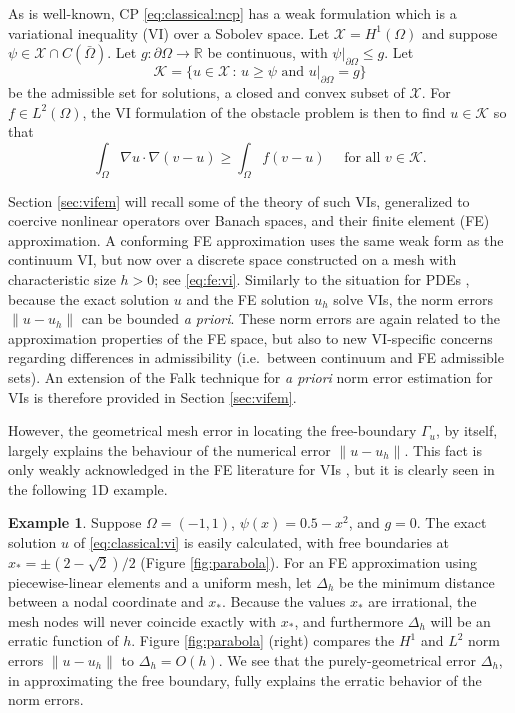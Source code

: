 \documentclass[]{interact}
\theoremstyle{plain}%
\theoremstyle{definition}
\newtheorem{example}[theorem]{Example}
\theoremstyle{remark}
\newcommand{\RR}{\mathbb{R}}
\newcommand{\cK}{\mathcal{K}}
\newcommand{\cX}{\mathcal{X}}
\begin{document}
As is well-known, CP \eqref{eq:classical:ncp} has a weak formulation which is a variational inequality (VI) over a Sobolev space.  Let $\cX=H^1(\Omega)$ \cite{ElmanSilvesterWathen2014} and suppose $\psi \in \cX \cap C(\bar\Omega)$.  Let $g:\partial \Omega\to \RR$ be continuous, with $\psi|_{\partial \Omega} \le g$.  Let
\begin{equation} \label{eq:classical:admissible}
\cK = \{u \in \cX \,:\, u \ge \psi \text{ and } u|_{\partial \Omega} = g\}
\end{equation}
be the admissible set for solutions, a closed and convex subset of $\cX$.  For $f\in L^2(\Omega)$, the VI formulation of the obstacle problem \cite{KinderlehrerStampacchia1980} is then to find $u\in \cK$ so that
\begin{equation} \label{eq:classical:vi}
\int_\Omega \nabla u \cdot \nabla(v - u) \ge \int_\Omega f(v - u) \quad \text{ for all } v \in \cK.
\end{equation}

Section \ref{sec:vifem} will recall some of the theory of such VIs, generalized to coercive nonlinear operators over Banach spaces, and their finite element (FE) approximation.  A conforming FE approximation uses the same weak form as the continuum VI, but now over a discrete space constructed on a mesh with characteristic size $h>0$; see \eqref{eq:fe:vi}.  Similarly to the situation for PDEs \cite{ElmanSilvesterWathen2014}, because the exact solution $u$ and the FE solution $u_h$ solve VIs, the norm errors $\|u-u_h\|$ can be bounded \emph{a priori}.  These norm errors are again related to the approximation properties of the FE space, but also to new VI-specific concerns regarding differences in admissibility (i.e.~between continuum and FE admissible sets).  An extension of the Falk \cite{Falk1974} technique for \emph{a priori} norm error estimation for VIs is therefore provided in Section \ref{sec:vifem}.

However, the geometrical mesh error in locating the free-boundary $\Gamma_u$, by itself, largely explains the behaviour of the numerical error $\|u-u_h\|$.  This fact is only weakly acknowledged in the FE literature for VIs \cite[for example]{Suttmeier2008}, but it is clearly seen in the following 1D example.

\begin{example}  Suppose $\Omega = (-1,1)$, $\psi(x)=0.5 - x^2$, and $g=0$.  The exact solution $u$ of \eqref{eq:classical:vi} is easily calculated, with free boundaries at $x_*=\pm(2-\sqrt{2})/2$ (Figure \ref{fig:parabola}).  For an FE approximation using piecewise-linear elements and a uniform mesh, let $\Delta_h$ be the minimum distance between a nodal coordinate and $x_*$.  Because the values $x_*$ are irrational, the mesh nodes will never coincide exactly with $x_*$, and furthermore $\Delta_h$ will be an erratic function of $h$.  Figure \ref{fig:parabola} (right) compares the $H^1$ and $L^2$ norm errors $\|u-u_h\|$ to $\Delta_h = O(h)$.  We see that the purely-geometrical error $\Delta_h$, in approximating the free boundary, fully explains the erratic behavior of the norm errors.
\end{example}
\end{document}
